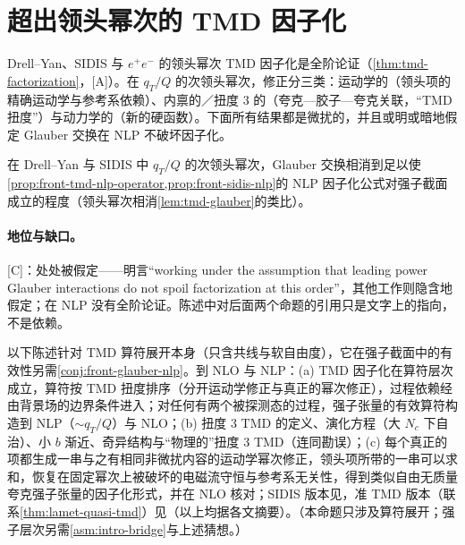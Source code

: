 \section{超出领头幂次的 TMD 因子化}\label{sec:front-nlp-tmd}

Drell--Yan、SIDIS 与 $e^+e^-$ 的领头幂次 TMD 因子化是全阶论证（\cref{thm:tmd-factorization}，[A]）。在 $q_T/Q$ 的次领头幂次，修正分三类：运动学的（领头项的精确运动学与参考系依赖）、内禀的／扭度 3 的（夸克—胶子—夸克关联，“TMD 扭度”）与动力学的（新的硬函数）。下面所有结果都是微扰的，并且或明或暗地假定 Glauber 交换在 NLP 不破坏因子化。

\begin{conjecture}\label{conj:front-glauber-nlp}
在 Drell--Yan 与 SIDIS 中 $q_T/Q$ 的次领头幂次，Glauber 交换相消到足以使\cref{prop:front-tmd-nlp-operator,prop:front-sidis-nlp}的 NLP 因子化公式对强子截面成立的程度（领头幂次相消\cref{lem:tmd-glauber}的类比）。
\end{conjecture}

\paragraph{地位与缺口。}[C]：处处被假定——\cite{Ebert:2021jhy}明言“working under the assumption that leading power Glauber interactions do not spoil factorization at this order”，其他工作则隐含地假定；在 NLP 没有全阶论证。陈述中对后面两个命题的引用只是文字上的指向，不是依赖。

\begin{proposition}\label{prop:front-tmd-nlp-operator}
以下陈述针对 TMD 算符展开本身（只含共线与软自由度），它在强子截面中的有效性另需\cref{conj:front-glauber-nlp}。到 NLO 与 NLP：(a) TMD 因子化在算符层次成立，算符按 TMD 扭度排序（分开运动学修正与真正的幂次修正），过程依赖经由背景场的边界条件进入；对任何有两个被探测态的过程，强子张量的有效算符构造到 NLP（$\sim q_T/Q$）与 NLO\cite{Vladimirov:2021hdn}；(b) 扭度 3 TMD 的定义、演化方程（大 $N_c$ 下自治）、小 $b$ 渐近、奇异结构与“物理的”扭度 3 TMD\cite{Rodini:2022wki}（连同勘误）；(c) 每个真正的项都生成一串与之有相同非微扰内容的运动学幂次修正，领头项所带的一串可以求和，恢复在固定幂次上被破坏的电磁流守恒与参考系无关性，得到类似自由无质量夸克强子张量的因子化形式，并在 NLO 核对\cite{Vladimirov:2023aot}；SIDIS 版本见\cite{Piloneta:2025jjb}，准 TMD 版本（联系\cref{thm:lamet-quasi-tmd}）见\cite{BrisCuerpo:2026pma}（以上均据各文摘要）。（本命题只涉及算符展开；强子层次另需\cref{asm:intro-bridge}与上述猜想。）
\end{proposition}

